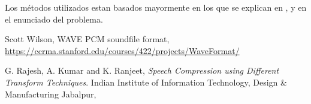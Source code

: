 \documentclass[12pt,a4paper]{article}
\begin{document}
	Los métodos utilizados estan basados mayormente en los que se explican en \cite{rajesh}, y en el enunciado del problema.

\clearpage

\begin{thebibliography}{9}
  
  Scott Wilson,
  WAVE PCM soundfile format,
  \url{https://ccrma.stanford.edu/courses/422/projects/WaveFormat/}

  G. Rajesh, A. Kumar and K. Ranjeet,
  \emph{Speech Compression using Different Transform Techniques}.
  Indian Institute of Information Technology, Design \& Manufacturing Jabalpur,

\end{thebibliography}
\end{document}
